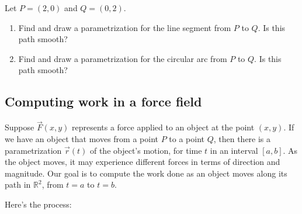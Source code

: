 \begin{ex}
    Let $P=(2,0)$ and $Q=(0,2)$.
    \begin{enumerate}
        \item Find and draw a parametrization for the line segment from $P$ to $Q$. Is this path smooth?
        \vfill 
        
        \item Find and draw a parametrization for the circular arc from $P$ to $Q$. Is this path smooth?
        \vfill
    \end{enumerate}
\end{ex}

\pagebreak

\subsection{Computing work in a force field}
Suppose $\vec{F}(x,y)$ represents a force applied to an object at the point $(x,y)$. If we have an object that moves from a point $P$ to a point $Q$, then there is a parametrization $\vec{r}(t)$ of the object's motion, for time $t$ in an interval $[a,b]$. As the object moves, it may experience different forces in terms of direction and magnitude. Our goal is to compute the work done as an object moves along its path in $\mathbb{R}^2$, from $t=a$ to $t=b$.

Here's the process:

